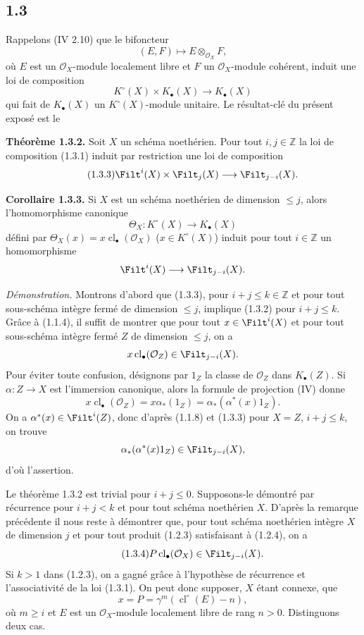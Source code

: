 \documentclass[11pt]{article}
\newcommand{\cl}{\operatorname{cl}}
\begin{document}
\subsection*{1.3}
Rappelons (IV 2.10) que le bifoncteur
\[
(E,F)\longmapsto E\otimes_{\mathcal O_X}F,
\]
où $E$ est un $\mathcal O_X$-module localement libre et $F$ un $\mathcal O_X$-module cohérent, induit une loi de composition
\begin{equation}\tag{1.3.1}
K^\circ(X)\times K_\bullet(X)\longrightarrow K_\bullet(X)
\end{equation}
qui fait de $K_\bullet(X)$ un $K^\circ(X)$-module unitaire. Le résultat-clé du présent exposé est le

\textbf{Théorème 1.3.2.} Soit $X$ un schéma noethérien. Pour tout $i,j\in\mathbb Z$ la loi de composition (1.3.1) induit par restriction une loi de composition
\begin{equation}\tag{1.3.3}
\Filt^i(X)\times\Filt_j(X)\longrightarrow\Filt_{j-i}(X).
\end{equation}

\textbf{Corollaire 1.3.3.} Si $X$ est un schéma noethérien de dimension $\leq j$, alors l'homomorphisme canonique
\[
\Theta_X:K^\circ(X)\longrightarrow K_\bullet(X)
\]
défini par $\Theta_X(x)=x\cl_\bullet(\mathcal O_X)$ ($x\in K^\circ(X)$) induit pour tout $i\in\mathbb Z$ un homomorphisme
\[
\Filt^i(X)\longrightarrow\Filt_{j-i}(X).
\]

\emph{Démonstration.} Montrons d'abord que (1.3.3), pour $i+j\leq k\in\mathbb Z$ et pour tout sous-schéma intègre fermé de dimension $\leq j$, implique (1.3.2) pour $i+j\leq k$. Grâce à (1.1.4), il suffit de montrer que pour tout $x\in\Filt^i(X)$ et pour tout sous-schéma intègre fermé $Z$ de dimension $\leq j$, on a
\[
x\cl_\bullet(\mathcal O_Z)\in\Filt_{j-i}(X).
\]
Pour éviter toute confusion, désignons par $1_Z$ la classe de $\mathcal O_Z$ dans $K_\bullet(Z)$. Si $\alpha:Z\to X$ est l'immersion canonique, alors la formule de projection (IV) donne
\[
x\cl_\bullet(\mathcal O_Z)=x\alpha_*(1_Z)=\alpha_*(\alpha^*(x)1_Z).
\]
On a $\alpha^*(x)\in\Filt^i(Z)$, donc d'après (1.1.8) et (1.3.3) pour $X=Z$, $i+j\leq k$, on trouve
\[
\alpha_*(\alpha^*(x)1_Z)\in\Filt_{j-i}(X),
\]
d'où l'assertion.

Le théorème 1.3.2 est trivial pour $i+j\leq0$. Supposons-le démontré par récurrence pour $i+j<k$ et pour tout schéma noethérien $X$. D'après la remarque précédente il nous reste à démontrer que, pour tout schéma noethérien intègre $X$ de dimension $j$ et pour tout produit (1.2.3) satisfaisant à (1.2.4), on a
\begin{equation}\tag{1.3.4}
P\cl_\bullet(\mathcal O_X)\in\Filt_{j-i}(X).
\end{equation}
Si $k>1$ dans (1.2.3), on a gagné grâce à l'hypothèse de récurrence et l'associativité de la loi (1.3.1). On peut donc supposer, $X$ étant connexe, que
\begin{equation}\tag{1.3.5}
x=P=\gamma^m(\cl^\circ(E)-n),
\end{equation}
où $m\geq i$ et $E$ est un $\mathcal O_X$-module localement libre de rang $n>0$. Distinguons deux cas.
\end{document}
